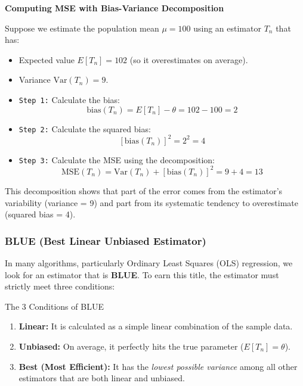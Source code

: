 \vspace{0.2cm}
\begin{example}{\textbf{Computing MSE with Bias-Variance Decomposition}}

Suppose we estimate the population mean $\mu = 100$ using an estimator $T_n$ that has:
\begin{itemize}
    \item Expected value $E[T_n] = 102$ (so it overestimates on average).
    \item Variance $\text{Var}(T_n) = 9$.
\end{itemize}

\begin{itemize}
    \item \texttt{Step 1:} Calculate the bias:
    \[
    \text{bias}(T_n) = E[T_n] - \theta = 102 - 100 = 2
    \]
    \item \texttt{Step 2:} Calculate the squared bias:
    \[
    [\text{bias}(T_n)]^2 = 2^2 = 4
    \]
    \item \texttt{Step 3:} Calculate the MSE using the decomposition:
    \[
    \text{MSE}(T_n) = \text{Var}(T_n) + [\text{bias}(T_n)]^2 = 9 + 4 = 13
    \]
\end{itemize}

This decomposition shows that part of the error comes from the estimator's variability (variance = 9) and part from its systematic tendency to overestimate (squared bias = 4).
\end{example}
    

\subsubsection{BLUE (Best Linear Unbiased Estimator)}
In many algorithms, particularly Ordinary Least Squares (OLS) regression, we look for an estimator that is \textbf{BLUE}. To earn this title, the estimator must strictly meet three conditions:

\begin{defbox}{The 3 Conditions of BLUE}
\begin{enumerate}
    \item \textbf{Linear:} It is calculated as a simple linear combination of the sample data.
    \item \textbf{Unbiased:} On average, it perfectly hits the true parameter ($E[T_n] = \theta$).
    \item \textbf{Best (Most Efficient):} It has the \textit{lowest possible variance} among all other estimators that are both linear and unbiased.
\end{enumerate}
\end{defbox}

